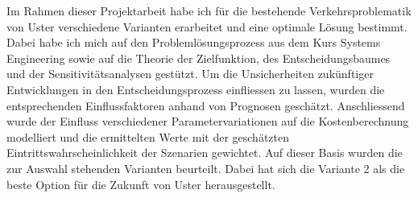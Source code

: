 Im Rahmen dieser Projektarbeit habe ich für die bestehende Verkehrsproblematik von Uster verschiedene Varianten erarbeitet und eine optimale Lösung bestimmt. Dabei habe ich mich auf den Problemlösungsprozess aus dem Kurs Systems Engineering sowie auf die Theorie der Zielfunktion, des Entscheidungsbaumes und der Sensitivitätsanalysen gestützt. Um die Unsicherheiten zukünftiger Entwicklungen in den Entscheidungsprozess einfliessen zu lassen, wurden die entsprechenden Einflussfaktoren anhand von Prognosen geschätzt. Anschliessend wurde der Einfluss verschiedener Parametervariationen auf die Kostenberechnung modelliert und die ermittelten Werte mit der geschätzten Eintrittswahrscheinlichkeit der Szenarien gewichtet. Auf dieser Basis wurden die zur Auswahl stehenden Varianten beurteilt. Dabei hat sich die Variante 2 als die beste Option für die Zukunft von Uster herausgestellt.



%

